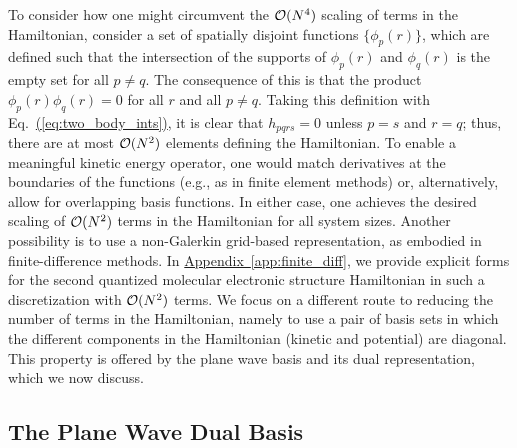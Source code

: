 \documentclass[superscriptaddress,aps,pra,nofootinbib,notitlepage,10pt,longbibliography]{revtex4-1}
\newcommand{\eq}[1]{Eq.~\hyperref[eq:#1]{(\ref*{eq:#1})}}
\DeclareRobustCommand{\app}[1]{\hyperref[app:#1]{Appendix~\ref*{app:#1}}}
\begin{document}
To consider how one might circumvent the ${\cal O}(N^4)$ scaling of terms in the Hamiltonian, consider a set of spatially disjoint functions $\{\phi_p(r)\}$, which are defined such that the intersection of the supports of $\phi_p(r)$ and $\phi_q(r)$ is the empty set for all $p \neq q$.  The consequence of this is that the product $\phi_p(r) \phi_q(r)=0$ for all $r$ and all $p \neq q$.  Taking this definition with \eq{two_body_ints}, it is clear that $h_{pqrs}=0$ unless $p=s$ and $r=q$; thus, there are at most ${\cal O}(N^2)$ elements defining the Hamiltonian. To enable a meaningful kinetic energy operator, one would match derivatives at the boundaries of the functions (e.g., as in finite element methods) or, alternatively, allow for overlapping basis functions. In either case, one achieves the desired scaling of ${\cal O}(N^2)$ terms in the Hamiltonian for all system sizes. Another possibility is to use a non-Galerkin grid-based representation, as embodied in  finite-difference methods. In \app{finite_diff}, we provide explicit forms for the second quantized molecular electronic structure Hamiltonian in such a discretization with ${\cal O}(N^2)$ terms. We focus on a different route to reducing the number of terms in the Hamiltonian, namely to use a pair of basis sets in which the different components in the Hamiltonian (kinetic and potential) are diagonal. This property is offered by the plane wave basis and its dual representation, which we now discuss.



\subsection{The Plane Wave Dual Basis}
\label{sec:pwd_basis}
\end{document}
